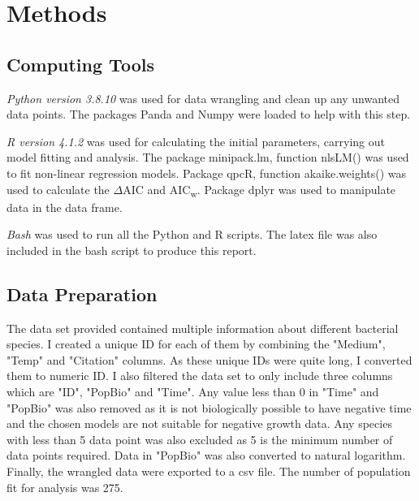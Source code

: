\documentclass[11pt]{article}
\begin{document}
\newpage
\section{Methods}
\subsection{Computing Tools}
\emph{Python version 3.8.10} was used for data wrangling and clean up any unwanted data points. The packages Panda and Numpy were loaded to help with this step. 

\emph{R version 4.1.2} was used for calculating the initial parameters, carrying out model fitting and analysis. The package minipack.lm, function nlsLM() was used to fit non-linear regression models. Package qpcR, function akaike.weights() was used to calculate the $\Delta$AIC and {AIC\textsubscript{w}}. Package dplyr was used to manipulate data in the data frame. 

\emph{Bash} was used to run all the Python and R scripts. The latex file was also included in the bash script to produce this report.  

\subsection{Data Preparation}
The data set provided contained multiple information about different bacterial species. I created a unique ID for each of them by combining the "Medium", "Temp" and "Citation" columns. As these unique IDs were quite long, I converted them to numeric ID. I also filtered the data set to only include three columns which are "ID", "PopBio" and "Time". Any value less than 0 in "Time" and "PopBio" was also removed as it is not biologically possible to have negative time and the chosen models are not suitable for negative growth data. Any species with less than 5 data point was also excluded as 5 is the minimum number of data points required. Data in "PopBio" was also converted to natural logarithm.  Finally, the wrangled data were exported to a csv file. The number of population fit for analysis was 275.
\end{document}

